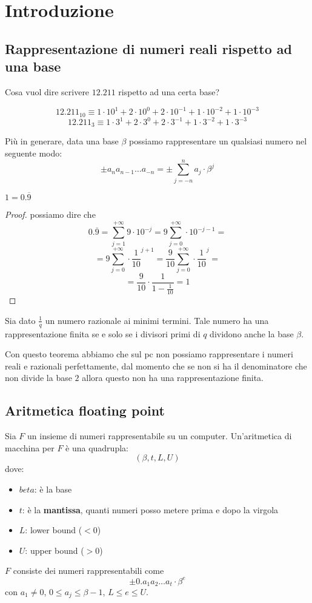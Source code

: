 \chapter{Introduzione}
\section{Rappresentazione di numeri reali rispetto ad una base}
Cosa vuol dire scrivere $12.211$ rispetto ad una certa base?

$$12.211_{10}\equiv 1\cdot 10^1+2\cdot 10^0 +2 \cdot 10^{-1} + 1 \cdot 10^{-2}+ 1 \cdot 10^{-3}$$
$$12.211_{3}\equiv 1\cdot 3^1+2\cdot 3^0 +2 \cdot 3^{-1} + 1 \cdot 3^{-2}+ 1 \cdot 3^{-3}$$

Più in generare, data una base $\beta$ possiamo rappresentare un qualsiasi
numero nel seguente modo:
$$\pm a_n a_{n-1}\dots a_{-n} = \pm \sum_{j = -n}^{n} a_j\cdot \beta^j $$
\begin{teorema}
    $1=0.\overline{9}$
    \begin{proof}
        possiamo dire che $$0.\overline{9} = \sum _{j=1}^{+\infty} 9\cdot 10^{-j}=9 \sum _{j=0}^{+\infty} \cdot 10^{-j-1}= $$
        $$=9 \sum _{j=0}^{+\infty} \cdot \frac{1}{10}^{j+1}=\frac{9}{10} \sum _{j=0}^{+\infty} \cdot \frac{1}{10}^{j}= $$
        $$=\frac{9}{10} \cdot \frac{1}{1-\frac{1}{10}} = 1$$
    \end{proof}
\end{teorema}
\begin{teorema}
    Sia dato $\frac{1}{q}$ un numero razionale ai minimi termini. Tale numero ha
    una rappresentazione finita se e solo se i divisori primi di $q$ dividono anche 
    la base $\beta$.
\end{teorema}
Con questo teorema abbiamo che sul pc non possiamo rappresentare i numeri reali 
e razionali perfettamente, dal momento che se non si ha il denominatore che non divide la base $2$
allora questo non ha una rappresentazione finita.

\section{Aritmetica floating point}
Sia $F$ un insieme di numeri rappresentabile su un computer. Un'aritmetica di macchina
per $F$ è una quadrupla:
\begin{equation}
    \left(\beta, t, L, U\right)
\end{equation}
dove:
\begin{itemize}
    \item $beta$: è la base
    \item $t$: è la \textbf{mantissa}, quanti numeri posso metere prima e dopo la virgola
    \item $L$: lower bound ($<0$)
    \item $U$: upper bound ($>0$)
\end{itemize}
$F$ consiste dei numeri rappresentabili come
\begin{equation}
    \pm 0.a_1a_2\dots a_t\cdot \beta ^e
\end{equation}
con $a_1\ne 0$, $0\le a_j\le \beta-1$, $L\le e\le U$.
